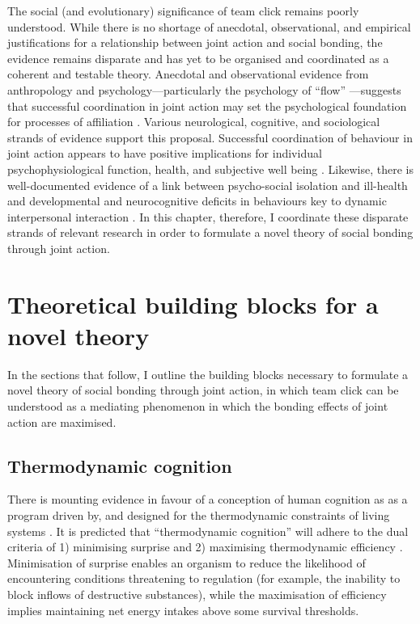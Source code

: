 \begin{CJK}{UTF8}{gbsn}
The social (and evolutionary) significance of team click remains poorly understood.  While there is no shortage of anecdotal, observational, and empirical justifications for a relationship between joint action and social bonding, the evidence remains disparate and has yet to be organised and coordinated as a coherent and testable theory.  Anecdotal and observational evidence from anthropology and psychology---particularly the psychology of ``flow'' \citep{Csikszentmihalyi1992,Jackson1999}---suggests that successful coordination in joint action may set the psychological foundation for processes of affiliation \citep{Marsh2009}.  Various neurological, cognitive, and sociological strands of evidence support this proposal.  Successful coordination of behaviour in joint action appears to have positive implications for individual psychophysiological function, health, and subjective well being \citep{Wheatley2012}.  Likewise, there is well-documented evidence of a link between psycho-social isolation and ill-health and developmental and neurocognitive deficits in behaviours key to dynamic interpersonal interaction \citep[e.g.][]{Blakemore2005,Baron-Cohen1991}. In this chapter, therefore, I coordinate these disparate strands of relevant research in order to formulate a novel theory of social bonding through joint action.


\section{Theoretical building blocks for a novel theory}


In the sections that follow, I outline the building blocks necessary to formulate a novel theory of social bonding through joint action, in which team click can be understood as a mediating phenomenon in which the bonding effects of joint action are maximised.


\subsection{Thermodynamic cognition}
There is mounting evidence in favour of a conception of human cognition as as a program driven by, and designed for the thermodynamic constraints of living systems \citep{Yufik2017}.  It is predicted that ``thermodynamic cognition'' will adhere to the dual criteria of 1) minimising surprise \citep{Friston2010,Sengupta2013,Sengupta2016,Sengupta2017} and 2) maximising thermodynamic efficiency \citep{Yufik2002,Yufik2013}.   Minimisation of surprise enables an organism to reduce the likelihood of encountering conditions threatening to regulation (for example, the inability to block inflows of destructive substances), while the maximisation of efficiency implies maintaining net energy intakes above some survival thresholds.


\end{CJK}
